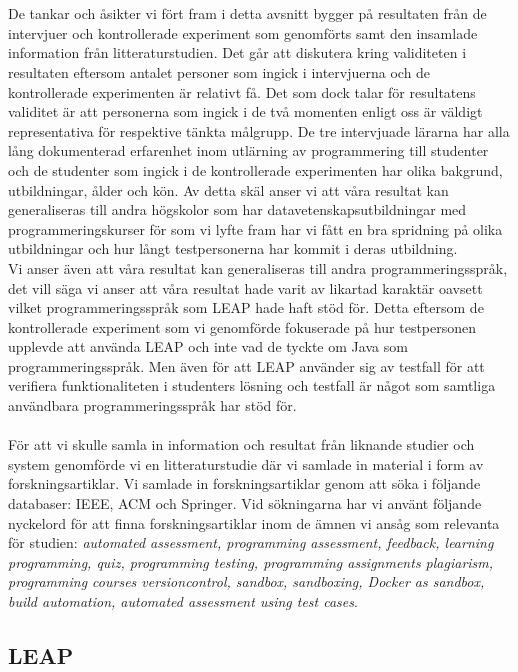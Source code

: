 \documentclass[a4paper,11pt]{article}
\begin{document}
{\\
\\
De tankar och åsikter vi fört fram i detta avsnitt bygger på resultaten från de intervjuer och kontrollerade experiment som genomförts samt den insamlade information från litteraturstudien. Det går att diskutera kring validiteten i resultaten eftersom antalet personer som ingick i intervjuerna och de kontrollerade experimenten är relativt få. Det som dock talar för resultatens validitet är att personerna som ingick i de två momenten enligt oss är väldigt representativa för respektive tänkta målgrupp. De tre intervjuade lärarna har alla lång dokumenterad erfarenhet inom utlärning av programmering till studenter och de studenter som ingick i de kontrollerade experimenten har olika bakgrund, utbildningar, ålder och kön. Av detta skäl anser vi att våra resultat kan generaliseras till andra högskolor som har datavetenskapsutbildningar med programmeringskurser för som vi lyfte fram har vi fått en bra spridning på olika utbildningar och hur långt testpersonerna har kommit i deras utbildning.
\\
Vi anser även att våra resultat kan generaliseras till andra programmeringsspråk, det vill säga vi anser att våra resultat hade varit av likartad karaktär oavsett vilket programmeringsspråk som LEAP hade haft stöd för. Detta eftersom de kontrollerade experiment som vi genomförde fokuserade på hur testpersonen upplevde att använda LEAP och inte vad de tyckte om Java som programmeringsspråk. Men även för att LEAP använder sig av testfall för att verifiera funktionaliteten i studenters lösning och testfall är något som samtliga användbara programmeringsspråk har stöd för.
\\
\\
För att vi skulle samla in information och resultat från liknande studier och system genomförde vi en litteraturstudie där vi samlade in material i form av forskningsartiklar. Vi samlade in forskningsartiklar genom att söka i följande databaser: IEEE, ACM och Springer. Vid sökningarna har vi använt följande nyckelord för att finna forskningsartiklar inom de ämnen vi ansåg som relevanta för studien: \textit{automated assessment, programming assessment, feedback, learning programming, quiz, programming testing, programming assignments plagiarism, programming courses versioncontrol, sandbox, sandboxing, Docker as sandbox, build automation, automated assessment using test cases}. 

\newpage
\subsection{LEAP}

}
\end{document}
